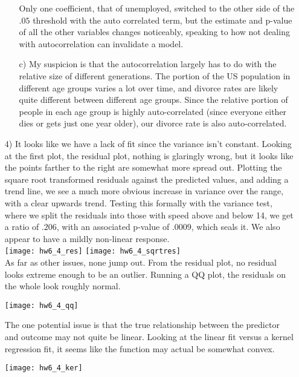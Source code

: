 \documentclass[11pt]{article}
\theoremstyle{definition}
\begin{document}
\begin{itemize}
\begin{itemize}
                Only one coefficient, that of unemployed, switched to the other side of the $.05$ threshold with the auto correlated term, but the estimate and p-value of all the other variables changes noticeably, speaking to how not dealing with autocorrelation can invalidate a model.

            \item[c)]
                My suspicion is that the autocorrelation largely has to do with the relative size of different generations. The portion of the US population in different age groups varies a lot over time, and divorce rates are likely quite different between different age groups. Since the relative portion of people in each age group is highly auto-correlated (since everyone either dies or gets just one year older), our divorce rate is also auto-correlated.
        \end{itemize}
    \item[4)]
        It looks like we have a lack of fit since the variance isn't constant. Looking at the first plot, the residual plot, nothing is glaringly wrong, but it looks like the points farther to the right are somewhat more spread out. Plotting the square root transformed residuals against the predicted values, and adding a trend line, we see a much more obvious increase in variance over the range, with a clear upwards trend. Testing this formally with the variance test, where we split the residuals into those with speed above and below 14, we get a ratio of $.206$, with an associated p-value of $.0009$, which seals it. We also appear to have a mildly non-linear response. \\
        \texttt{[image: hw6\_4\_res]} 
        \texttt{[image: hw6\_4\_sqrtres]}  \\
             As far as other issues, none jump out. From the residual plot, no residual looks extreme enough to be an outlier. Running a QQ plot, the residuals on the whole look roughly normal. \\
        \begin{center}
            \texttt{[image: hw6\_4\_qq]} 
        \end{center}
        The one potential issue is that the true relationship between the predictor and outcome may not quite be linear. Looking at the linear fit versus a kernel regression fit, it seems like the function may actual be somewhat convex. 
        \begin{center}
            \texttt{[image: hw6\_4\_ker]} 
        \end{center}

\end{itemize}
\end{document}
